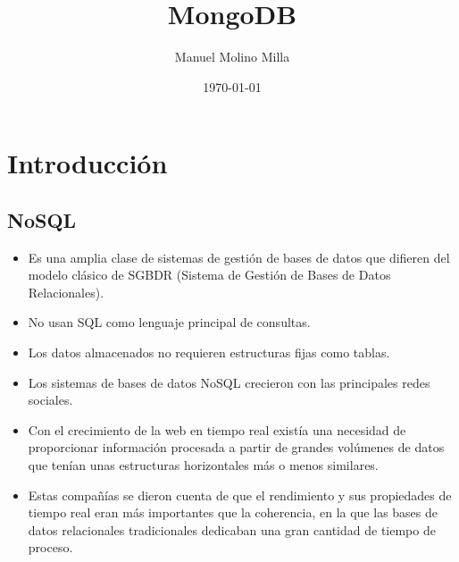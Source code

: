 \documentclass[4paper]{article}
\author{Manuel Molino Milla}
\title{\textbf{MongoDB}}
\date{\today}
\begin{document}
\maketitle 
\tableofcontents
\newpage

\section{Introducción}

\subsection{NoSQL}
\begin{itemize}
\item Es una amplia clase de sistemas de gestión de bases de datos que difieren del modelo clásico de SGBDR (Sistema de Gestión de Bases de Datos Relacionales).
\item No usan SQL como lenguaje principal de consultas.
\item Los datos almacenados no requieren estructuras fijas como tablas.
\item Los sistemas de bases de datos NoSQL crecieron con las principales redes sociales.
\item Con el crecimiento de la web en tiempo real existía una necesidad de proporcionar información procesada a partir de grandes volúmenes de datos que tenían unas estructuras horizontales más o menos similares. 
\item Estas compañías se dieron cuenta de que el rendimiento y sus propiedades de tiempo real eran más importantes que la coherencia, en la que las bases de datos relacionales tradicionales dedicaban una gran cantidad de tiempo de proceso.
\end{itemize}
\end{document}
